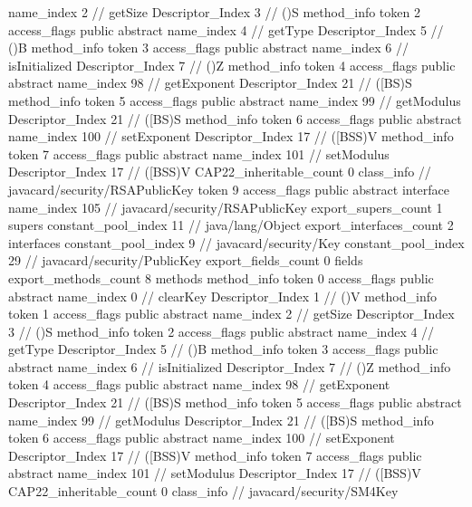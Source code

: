 {{{{{					name_index	2		// getSize
					Descriptor_Index	3		// ()S
				}
				method_info {
					token	2
					access_flags	public abstract
					name_index	4		// getType
					Descriptor_Index	5		// ()B
				}
				method_info {
					token	3
					access_flags	public abstract
					name_index	6		// isInitialized
					Descriptor_Index	7		// ()Z
				}
				method_info {
					token	4
					access_flags	public abstract
					name_index	98		// getExponent
					Descriptor_Index	21		// ([BS)S
				}
				method_info {
					token	5
					access_flags	public abstract
					name_index	99		// getModulus
					Descriptor_Index	21		// ([BS)S
				}
				method_info {
					token	6
					access_flags	public abstract
					name_index	100		// setExponent
					Descriptor_Index	17		// ([BSS)V
				}
				method_info {
					token	7
					access_flags	public abstract
					name_index	101		// setModulus
					Descriptor_Index	17		// ([BSS)V
				}
			}
			CAP22_inheritable_count	0
		}
		class_info {		// javacard/security/RSAPublicKey
			token	9
			access_flags	public abstract interface
			name_index	105		// javacard/security/RSAPublicKey
			export_supers_count	1
			supers {
				constant_pool_index	11		// java/lang/Object
			}
			export_interfaces_count	2
			interfaces {
				constant_pool_index	9		// javacard/security/Key
				constant_pool_index	29		// javacard/security/PublicKey
			}
			export_fields_count	0
			fields {
			}
			export_methods_count	8
			methods {
				method_info {
					token	0
					access_flags	public abstract
					name_index	0		// clearKey
					Descriptor_Index	1		// ()V
				}
				method_info {
					token	1
					access_flags	public abstract
					name_index	2		// getSize
					Descriptor_Index	3		// ()S
				}
				method_info {
					token	2
					access_flags	public abstract
					name_index	4		// getType
					Descriptor_Index	5		// ()B
				}
				method_info {
					token	3
					access_flags	public abstract
					name_index	6		// isInitialized
					Descriptor_Index	7		// ()Z
				}
				method_info {
					token	4
					access_flags	public abstract
					name_index	98		// getExponent
					Descriptor_Index	21		// ([BS)S
				}
				method_info {
					token	5
					access_flags	public abstract
					name_index	99		// getModulus
					Descriptor_Index	21		// ([BS)S
				}
				method_info {
					token	6
					access_flags	public abstract
					name_index	100		// setExponent
					Descriptor_Index	17		// ([BSS)V
				}
				method_info {
					token	7
					access_flags	public abstract
					name_index	101		// setModulus
					Descriptor_Index	17		// ([BSS)V
				}
			}
			CAP22_inheritable_count	0
		}
		class_info {		// javacard/security/SM4Key
}}}
